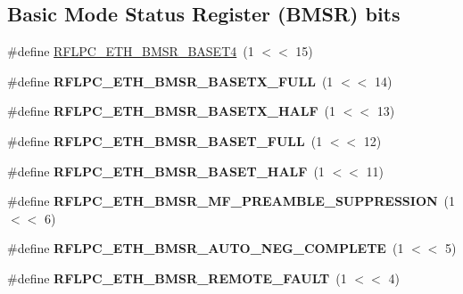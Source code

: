 \subsection*{Basic Mode Status Register (B\-M\-S\-R) bits}
\begin{DoxyCompactItemize}
\item 
\#define \hyperlink{group__eth_gaf02f683088239f9b4fb88f81aa94f73f}{R\-F\-L\-P\-C\-\_\-\-E\-T\-H\-\_\-\-B\-M\-S\-R\-\_\-B\-A\-S\-E\-T4}~(1 $<$$<$ 15)
\item 
\hypertarget{group__eth_ga464681ad5b8dd8a1d6996977afeac29b}{\#define {\bfseries R\-F\-L\-P\-C\-\_\-\-E\-T\-H\-\_\-\-B\-M\-S\-R\-\_\-B\-A\-S\-E\-T\-X\-\_\-\-F\-U\-L\-L}~(1 $<$$<$ 14)}\label{group__eth_ga464681ad5b8dd8a1d6996977afeac29b}

\item 
\hypertarget{group__eth_ga9a5b6c397199f567ec58e9ec9378df03}{\#define {\bfseries R\-F\-L\-P\-C\-\_\-\-E\-T\-H\-\_\-\-B\-M\-S\-R\-\_\-B\-A\-S\-E\-T\-X\-\_\-\-H\-A\-L\-F}~(1 $<$$<$ 13)}\label{group__eth_ga9a5b6c397199f567ec58e9ec9378df03}

\item 
\hypertarget{group__eth_gaaf043eae264e2b92a3c631fba2b4848f}{\#define {\bfseries R\-F\-L\-P\-C\-\_\-\-E\-T\-H\-\_\-\-B\-M\-S\-R\-\_\-B\-A\-S\-E\-T\-\_\-\-F\-U\-L\-L}~(1 $<$$<$ 12)}\label{group__eth_gaaf043eae264e2b92a3c631fba2b4848f}

\item 
\hypertarget{group__eth_ga28f18ac954d9809deaf4ba813d315ac8}{\#define {\bfseries R\-F\-L\-P\-C\-\_\-\-E\-T\-H\-\_\-\-B\-M\-S\-R\-\_\-B\-A\-S\-E\-T\-\_\-\-H\-A\-L\-F}~(1 $<$$<$ 11)}\label{group__eth_ga28f18ac954d9809deaf4ba813d315ac8}

\item 
\hypertarget{group__eth_ga5d59771cf8e7a122a82f16c08ed787be}{\#define {\bfseries R\-F\-L\-P\-C\-\_\-\-E\-T\-H\-\_\-\-B\-M\-S\-R\-\_\-\-M\-F\-\_\-\-P\-R\-E\-A\-M\-B\-L\-E\-\_\-\-S\-U\-P\-P\-R\-E\-S\-S\-I\-O\-N}~(1 $<$$<$ 6)}\label{group__eth_ga5d59771cf8e7a122a82f16c08ed787be}

\item 
\hypertarget{group__eth_ga009965515adb3addbec0fa02b1b3ab68}{\#define {\bfseries R\-F\-L\-P\-C\-\_\-\-E\-T\-H\-\_\-\-B\-M\-S\-R\-\_\-\-A\-U\-T\-O\-\_\-\-N\-E\-G\-\_\-\-C\-O\-M\-P\-L\-E\-T\-E}~(1 $<$$<$ 5)}\label{group__eth_ga009965515adb3addbec0fa02b1b3ab68}

\item 
\hypertarget{group__eth_gaeaaacf5bae22d6b6f3ac37b683e12ad8}{\#define {\bfseries R\-F\-L\-P\-C\-\_\-\-E\-T\-H\-\_\-\-B\-M\-S\-R\-\_\-\-R\-E\-M\-O\-T\-E\-\_\-\-F\-A\-U\-L\-T}~(1 $<$$<$ 4)}\label{group__eth_gaeaaacf5bae22d6b6f3ac37b683e12ad8}


\end{DoxyCompactItemize}

